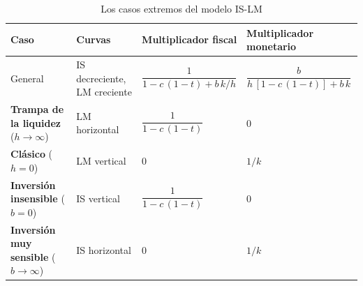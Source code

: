 \documentclass[11pt]{article}
\begin{document}
\begin{table}[H]
\centering
\caption{Los casos extremos del modelo IS-LM}\label{tab:casos-islm}
\small
\begin{tabular}{>{\raggedright\arraybackslash}m{3.7cm}>{\centering\arraybackslash}m{2.3cm}>{\centering\arraybackslash}m{3.4cm}>{\centering\arraybackslash}m{3.4cm}}
\toprule
\rowcolor{tceeazulpalido}\textbf{Caso} & \textbf{Curvas} & \textbf{Multiplicador fiscal} & \textbf{Multiplicador monetario}\\
\midrule
General & IS decreciente, LM creciente & $\dfrac{1}{1-c\,(1-t)+b\,k/h}$ & $\dfrac{b}{h\,[1-c\,(1-t)]+b\,k}$\\
\addlinespace[0.3em]
\textcolor{tceeazul}{\textbf{Trampa de la liquidez}} ($h\to\infty$) & LM horizontal & $\dfrac{1}{1-c\,(1-t)}$ & $0$\\
\addlinespace[0.3em]
\textcolor{tceeverde}{\textbf{Clásico}} ($h=0$) & LM vertical & $0$ & $1/k$\\
\addlinespace[0.3em]
\textcolor{tceeazul}{\textbf{Inversión insensible}} ($b=0$) & IS vertical & $\dfrac{1}{1-c\,(1-t)}$ & $0$\\
\addlinespace[0.3em]
\textcolor{tceeverde}{\textbf{Inversión muy sensible}} ($b\to\infty$) & IS horizontal & $0$ & $1/k$\\
\bottomrule
\end{tabular}
\end{table}
\end{document}
